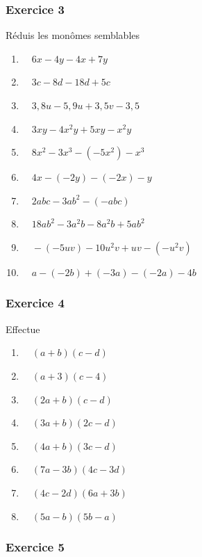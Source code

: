 \documentclass[
  12pt,
]{book}
\providecommand{\tightlist}{%
  \setlength{\itemsep}{0pt}\setlength{\parskip}{0pt}}
\begin{document}
\hypertarget{exercice-3-3}{%
\subsubsection*{Exercice 3}\label{exercice-3-3}}

Réduis les monômes semblables

\begin{enumerate}
\def\labelenumi{\arabic{enumi}.}
\tightlist
\item
  \(\quad 6x-4y-4x+7y\)
\item
  \(\quad 3c-8d-18d+5c\)
\item
  \(\quad 3{,}8u-5{,}9u+3{,}5v-3{,}5\)
\item
  \(\quad 3xy -4x^2y+5xy-x^2y\)
\item
  \(\quad 8x^2-3x^3-(-5x^2)-x^3\)
\item
  \(\quad 4x-(-2y)-(-2x)-y\)
\item
  \(\quad 2abc -3ab^2-(-abc)\)
\item
  \(\quad 18ab^2-3a^2b-8a^2b+5ab^2\)
\item
  \(\quad -(-5uv)-10u^2v+uv-(-u^2v)\)
\item
  \(\quad a-(-2b)+(-3a)-(-2a)-4b\)
\end{enumerate}

\hypertarget{exercice-4-3}{%
\subsubsection*{Exercice 4}\label{exercice-4-3}}

Effectue

\begin{enumerate}
\def\labelenumi{\arabic{enumi}.}
\tightlist
\item
  \(\quad (a+b)(c-d)\)
\item
  \(\quad (a+3)(c-4)\)
\item
  \(\quad (2a+b)(c-d)\)
\item
  \(\quad (3a+b)(2c-d)\)
\item
  \(\quad (4a+b)(3c-d)\)
\item
  \(\quad (7a-3b)(4c-3d)\)
\item
  \(\quad (4c-2d)(6a+3b)\)
\item
  \(\quad (5a-b)(5b-a)\)
\end{enumerate}

\hypertarget{exercice-5-3}{%
\subsubsection*{Exercice 5}\label{exercice-5-3}}
\end{document}
